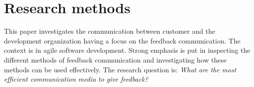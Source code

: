 \documentclass[conference]{IEEEtran}
\begin{document}
\begin{comment}
Bhalerao states that feedback communication should be done face-to-face \cite{2010bhalerao}. Also Korkala et. al. underlines the importance of face-to-face communication by arguing that it should be the default communication method in agile development \cite{2006korkala}.

Despite the advantages of face-to-face communication it is also a costly communication method. Face-to-face communication is synchronous method which requires shared physical location. In software projects where customer is not on-site, other feedback methods than have to be exercised.


\subsection{Video conference and telephone}

\subsection{Email}

\subsection{Chat rooms}

\textbf{TODO: Synchronous vs. asynchonous methods, Email, Video conference, documents etc.}

\section{Communication and feedback methods in software projects}

\end{comment}

\section{Research methods}

This paper investigates the communication between customer and the development organization having a focus on the feedback communication. The context is in agile software development. Strong emphasis is put in inspecting the different methods of feedback communication and investigating how these methods can be used effectively. The research question is: \textit{What are the most efficient communication media to give feedback?}
\end{document}
